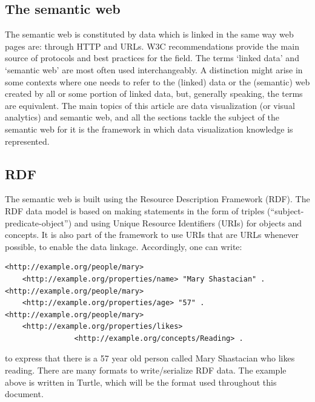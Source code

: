 \documentclass[12pt,fleqn]{article}
\begin{document}
\subsection{The semantic web}
The semantic web is constituted by data which is linked in the same way
web pages are: through HTTP and URLs.
W3C recommendations provide the main source of protocols and best practices for the field.
The terms `linked data' and `semantic web' are most often used interchangeably.
A distinction might arise in some contexts where one needs to refer to the (linked) data or
the (semantic) web created by all or some portion of linked data, but, generally speaking, the terms are equivalent.
% 
% 
% 
% 
%
The main topics of this article are data visualization (or visual analytics)
and semantic web, and all the sections tackle the subject of the semantic web
for it is the framework in which data visualization knowledge is represented.

\subsection{RDF}
The semantic web is built using the Resource Description Framework (RDF).
The RDF data model is based on making statements in the form of triples
(``subject-predicate-object'') and using Unique Resource Identifiers (URIs) for
objects and concepts.
It is also part of the framework to use URIs that are URLs whenever possible,
to enable the data linkage.
Accordingly, one can write:

\begin{Verbatim}[fontsize=\footnotesize]
<http://example.org/people/mary>
	<http://example.org/properties/name> "Mary Shastacian" .
<http://example.org/people/mary>
	<http://example.org/properties/age> "57" .
<http://example.org/people/mary> 
	<http://example.org/properties/likes> 
                <http://example.org/concepts/Reading> .
\end{Verbatim}
\noindent to express that there is a 57 year old person called Mary Shastacian who likes reading.
There are many formats to write/serialize RDF data.
The example above is written in Turtle, which will be the format used throughout this document.
\end{document}
